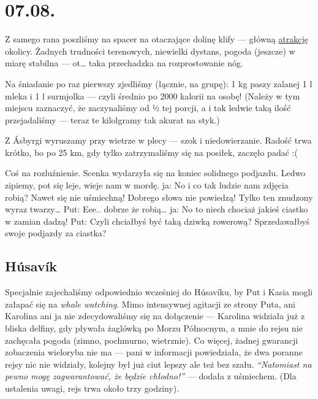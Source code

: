 \chapter*{07.08.}

Z samego rana poszliśmy na spacer na otaczające dolinę klify --- główną \href{http://www.visithusavik.com/attractions/asbyrgi-canyon/}{atrakcję} okolicy. Żadnych trudności terenowych, niewielki dystans, pogoda (jeszcze) w miarę stabilna --- ot… taka przechadzka na rozprostowanie nóg.

Na śniadanie po raz pierwszy zjedliśmy (łącznie, na grupę): 1 kg paszy zalanej 1 l mleka i 1 l surmjolka --- czyli średnio po 2000 kalorii na osobę! (Należy w tym miejscu zaznaczyć, że zaczynaliśmy od ½ tej porcji, a i tak ledwie taką ilość przejadaliśmy --- teraz te kilolgramy tak akurat na styk.)


Z Ásbyrgi wyruszamy przy wietrze w plecy --- szok i niedowierzanie. Radość trwa krótko, bo po 25 km, gdy tylko zatrzymaliśmy się na posiłek, zaczęło padać :(

Coś na rozluźnienie. Scenka wydarzyła się na koniec solidnego podjazdu. Ledwo zipiemy, pot się leje, wieje nam w mordę.
ja: No i co tak ludzie nam zdjęcia robią? Nawet się nie uśmiechną! Dobrego słowa nie powiedzą! Tylko ten znudzony wyraz twarzy…
Put: Eee.. dobrze że robią…
ja: No to niech chociaż jakieś ciastko w zamian dadzą!
Put: Czyli chciałbyś być taką dziwką rowerową? Sprzedawałbyś swoje podjazdy za ciastka?

\section*{Húsavík}

Specjalnie zajechaliśmy odpowiednio wcześniej do Húsavíku, by Put i Kasia mogli załapać się na \emph{whale watching}. Mimo intensywnej agitacji ze strony Puta, ani Karolina ani ja nie zdecydowaliśmy się na dołączenie --- Karolina widziała już z bliska delfiny, gdy pływała żaglówką po Morzu Północnym, a mnie do rejsu nie zachęcała pogoda (zimno, pochmurno, wietrznie). Co więcej, żadnej gwarancji zobaczenia wieloryba nie ma --- pani w informacji powiedziała, że dwa poranne rejsy nic nie widziały, kolejny był już ciut lepszy ale też bez szału. \emph{“Natomiast na pewno mogę zagwarantować, że będzie chłodno!”} --- dodała z uśmiechem. (Dla ustalenia uwagi, rejs trwa około trzy godziny).

